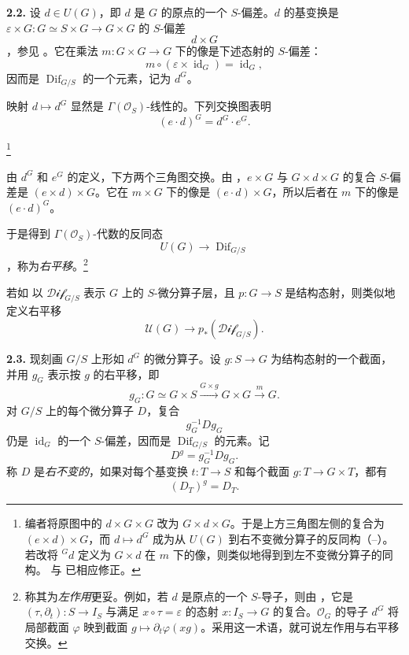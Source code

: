 \medskip
\noindent\textbf{2.2.}
\label{sga3:VIIA:2.2}
设 \(d\in U(G)\)，即 \(d\) 是 \(G\) 的原点的一个 \(S\)-偏差。\(d\) 的基变换是 \(\varepsilon\times G:G\simeq S\times G\to G\times G\) 的 \(S\)-偏差
\[
  d\times G
\]
，参见 。它在乘法 \(m:G\times G\to G\) 下的像是下述态射的 \(S\)-偏差：
\[
  m\circ(\varepsilon\times\operatorname{id}_G)
  =\operatorname{id}_G,
\]
因而是 \(\operatorname{Dif}_{G/S}\) 的一个元素，记为 \(d^G\)。

映射 \(d\mapsto d^G\) 显然是 \(\Gamma(\mathcal O_S)\)-线性的。下列交换图表明
\[
  (e\cdot d)^G=d^G\cdot e^G.
\]
\begin{center}
  \label{sga3:VIIA:2.2-right-translation-associativity}
  
\end{center}
\footnote{编者将原图中的 \(d\times G\times G\) 改为 \(G\times d\times G\)。于是上方三角图左侧的复合为 \((e\times d)\times G\)，而 \(d\mapsto d^G\) 成为从 \(U(G)\) 到右不变微分算子的反同构（--）。若改将 \({}^Gd\) 定义为 \(G\times d\) 在 \(m\) 下的像，则类似地得到到左不变微分算子的同构。 与  已相应修正。}

由 \(d^G\) 和 \(e^G\) 的定义，下方两个三角图交换。由 ，\(e\times G\) 与 \(G\times d\times G\) 的复合 \(S\)-偏差是 \((e\times d)\times G\)。它在 \(m\times G\) 下的像是 \((e\cdot d)\times G\)，所以后者在 \(m\) 下的像是 \((e\cdot d)^G\)。

于是得到 \(\Gamma(\mathcal O_S)\)-代数的反同态
\[
  U(G)\longrightarrow\operatorname{Dif}_{G/S}
\]
，称为\emph{右平移}。\footnote{称其为\emph{左作用}更妥。例如，若 \(d\) 是原点的一个 \(S\)-导子，则由 ，它是 \((\tau,\partial_t):S\to I_S\) 与满足 \(x\circ\tau=\varepsilon\) 的态射 \(x:I_S\to G\) 的复合。\(\mathcal O_G\) 的导子 \(d^G\) 将局部截面 \(\varphi\) 映到截面 \(g\mapsto\partial_t\varphi(xg)\)。采用这一术语，就可说左作用与右平移交换。}

若如  以 \(\mathcal{Dif}_{G/S}\) 表示 \(G\) 上的 \(S\)-微分算子层，且 \(p:G\to S\) 是结构态射，则类似地定义右平移
\[
  \mathcal U(G)\longrightarrow p_*(\mathcal{Dif}_{G/S}).
\]

\medskip
\noindent\textbf{2.3.}
\label{sga3:VIIA:2.3}
现刻画 \(G/S\) 上形如 \(d^G\) 的微分算子。设 \(g:S\to G\) 为结构态射的一个截面，并用 \(g_G\) 表示按 \(g\) 的右平移，即
\[
  g_G:
  G\simeq G\times S
  \xrightarrow{G\times g}G\times G
  \xrightarrow{m}G.
\]
对 \(G/S\) 上的每个微分算子 \(D\)，复合
\[
  g_G^{-1}Dg_G
\]
仍是 \(\operatorname{id}_G\) 的一个 \(S\)-偏差，因而是 \(\operatorname{Dif}_{G/S}\) 的元素。记
\[
  D^g=g_G^{-1}Dg_G.
\]
称 \(D\) 是\emph{右不变的}，如果对每个基变换 \(t:T\to S\) 和每个截面 \(g:T\to G\times T\)，都有
\[
  (D_T)^g=D_T.
\]

